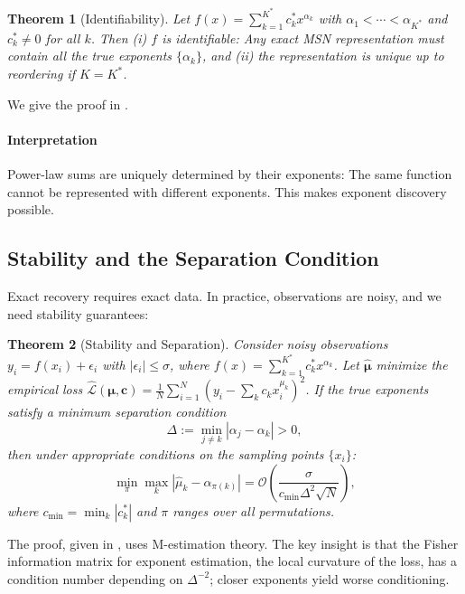 \documentclass{article}
\theoremstyle{plain}
\newtheorem{theorem}{Theorem}[section]
\theoremstyle{definition}
\theoremstyle{remark}
\newcommand{\mcL}{\mathcal{L}}
\newcommand{\mcO}{\mathcal{O}}
\newcommand{\bmu}{\bm{\mu}}
\newcommand{\bc}{\bm{c}}
\begin{document}
\begin{theorem}[Identifiability]
	\label{thm:identifiability}
	Let $f(x) = \sum_{k=1}^{K^*} c_k^* x^{\alpha_k}$ with $\alpha_1 < \cdots < \alpha_{K^*}$ and $c_k^* \neq 0$ for all $k$. Then (i) $f$ is identifiable: Any exact MSN representation must contain all the true exponents $\{\alpha_k\}$, and (ii) the representation is unique up to reordering if $K = K^*$.
\end{theorem}
We give the proof in .

\paragraph{Interpretation} Power-law sums are uniquely determined by their exponents: The same function cannot be represented with different exponents. This makes exponent discovery possible.

\subsection{Stability and the Separation Condition}

Exact recovery requires exact data. In practice, observations are noisy, and we need stability guarantees:
\begin{theorem}[Stability and Separation]
	\label{thm:stability}
	Consider noisy observations $y_i = f(x_i) + \epsilon_i$ with $|\epsilon_i| \leq \sigma$, where $f(x) = \sum_{k=1}^{K^*} c_k^* x^{\alpha_k}$. Let $\hat{\bmu}$ minimize the empirical loss $\hat{\mcL}(\bmu, \bc) = \frac{1}{N}\sum_{i=1}^N (y_i - \sum_k c_k x_i^{\mu_k})^2$. If the true exponents satisfy a minimum separation condition
	\begin{equation}
		\Delta := \min_{j \neq k} |\alpha_j - \alpha_k| > 0,
	\end{equation}
	then under appropriate conditions on the sampling points $\{x_i\}$:
	\begin{equation}
		\min_{\pi} \max_k |\hat{\mu}_k - \alpha_{\pi(k)}| = \mcO(\frac{\sigma}{c_{\min} \Delta^2 \sqrt{N}}),
	\end{equation}
	where $c_{\min} = \min_k |c_k^*|$ and $\pi$ ranges over all permutations.
\end{theorem}
The proof, given in , uses M-estimation theory. The key insight is that the Fisher information matrix for exponent estimation, the local curvature of the loss, has a condition number depending on $\Delta^{-2}$; closer exponents yield worse conditioning.
\end{document}
